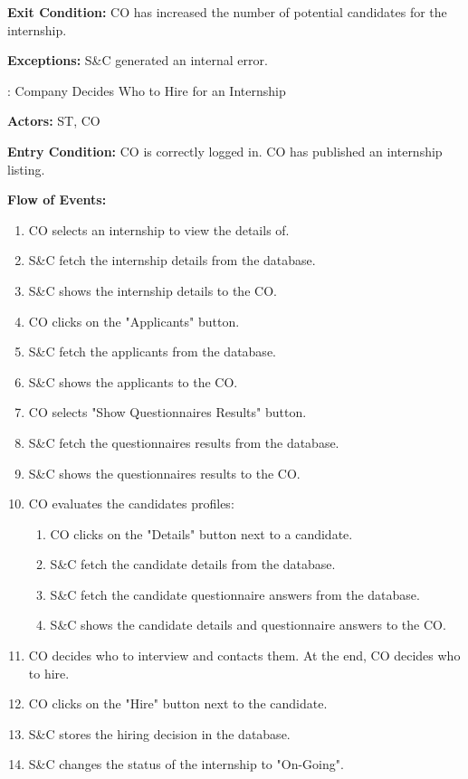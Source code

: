 \par \textbf{Exit Condition:} CO has increased the number of potential candidates for the internship.

\par \textbf{Exceptions:}  S\&C generated an internal error.

\nextUseCaseID: Company Decides Who to Hire for an Internship

\par \textbf{Actors:} ST, CO

\par \textbf{Entry Condition:} CO is correctly logged in. CO has published an internship listing.

\par \textbf{Flow of Events:}

\begin{enumerate}
    \item CO selects an internship to view the details of.
    \item S\&C fetch the internship details from the database.
    \item S\&C shows the internship details to the CO.
    \item CO clicks on the "Applicants" button.
    \item S\&C fetch the applicants from the database.
    \item S\&C shows the applicants to the CO.
    \item CO selects "Show Questionnaires Results" button.
    \item S\&C fetch the questionnaires results from the database.
    \item S\&C shows the questionnaires results to the CO.
    \item CO evaluates the candidates profiles:
    \begin{enumerate}
        \item CO clicks on the "Details" button next to a candidate.
        \item S\&C fetch the candidate details from the database.
        \item S\&C fetch the candidate questionnaire answers from the database.
        \item S\&C shows the candidate details and questionnaire answers to the CO.
    \end{enumerate}
    \item CO decides who to interview and contacts them. At the end, CO decides who to hire.
    \item CO clicks on the "Hire" button next to the candidate.
    \item S\&C stores the hiring decision in the database.
    \item S\&C changes the status of the internship to "On-Going".
\end{enumerate}

